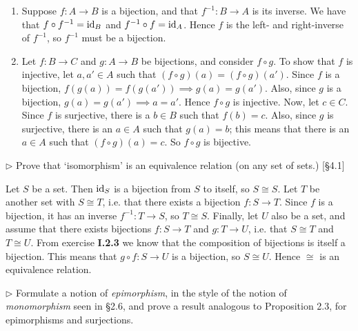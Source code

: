 \begin{enumerate}
	\item Suppose $f:A\to B$ is a bijection, and that $f^{-1}:B\to A$ is its inverse.
	We have that $f\circ f^{-1} = \mathrm{id}_B$ and $f^{-1}\circ f = \mathrm{id}_A$. Hence $f$ is
	the left- and right-inverse of $f^{-1}$, so $f^{-1}$ must be a bijection.
	
	\item Let $f:B\to C$ and $g:A\to B$ be bijections, and consider $f\circ g$. To
	show that $f$ is injective, let $a, a'\in A$ such that $(f\circ g)(a) = (f\circ
	g)(a')$. Since $f$ is a bijection, $f(g(a)) = f(g(a')) \implies g(a) = g(a')$.
	Also, since $g$ is a bijection, $g(a) = g(a') \implies a=a'$. Hence $f\circ g$
	is injective. Now, let $c\in C$. Since $f$ is surjective, there is a $b\in B$
	such that $f(b) = c$. Also, since $g$ is surjective, there is an $a\in A$ such
	that $g(a) = b$; this means that there is an $a\in A$ such that $(f\circ g)(a) =
	c$. So $f\circ g$ is bijective.
\end{enumerate}


\begin{problem}[2.4]
	$\rhd$ Prove that `isomorphism' is an equivalence relation (on any set
	of sets.) [\S4.1]
\end{problem}

\begin{solution}
	Let $S$ be a set. Then $\mathrm{id}_S$ is a bijection from $S$ to itself, so $S\cong S$.
	Let $T$ be another set with $S\cong T$, i.e. that there exists a bijection
	$f:S\to T$. Since $f$ is a bijection, it has an inverse $f^{-1}:T\to S$, so
	$T\cong S$. Finally, let $U$ also be a set, and assume that there exists
	bijections $f:S\to T$ and $g:T\to U$, i.e. that $S\cong T$ and $T\cong U$. From
	exercise \textbf{I.2.3} we know that the composition of bijections is itself a
	bijection. This means that $g\circ f: S\to U$ is a bijection, so $S\cong U$.
	Hence $\cong$ is an equivalence relation.
\end{solution}


\begin{problem}[2.5]
	$\rhd$ Formulate a notion of \textit{epimorphism}, in the style
	of the notion of \textit{monomorphism} seen in \S 2.6, and prove a result
	analogous to Proposition 2.3, for epimorphisms and surjections.
\end{problem}


